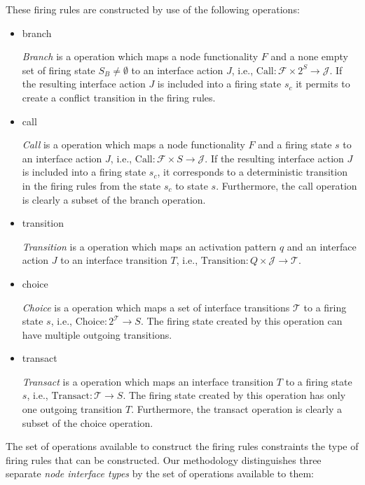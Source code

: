 These firing rules are constructed by use of the following operations:

\begin{itemize}
\item branch

\emph{Branch} is a operation which maps a node functionality $F$ and
a none empty set of firing state $S_{B} \ne \emptyset$ to an interface action $J$,
i.e., $\mathrm{Call}: \mathcal{F} \times 2^S \to \mathcal{J}$.
If the resulting interface action $J$ is included into a
firing state $s_{c}$ it permits to create a conflict transition
in the firing rules.
\item call

\emph{Call} is a operation which maps a node functionality $F$ and
a firing state $s$ to an interface action $J$,
i.e., $\mathrm{Call}: \mathcal{F} \times S \to \mathcal{J}$.
If the resulting interface action $J$ is included into a
firing state $s_{c}$, it corresponds to a deterministic transition
in the firing rules from the state $s_{c}$ to state $s$.
Furthermore, the call operation is clearly a subset of the
branch operation.

\item transition

\emph{Transition} is a operation which maps an activation pattern $q$ and
an interface action $J$ to an interface transition $T$,
i.e., $\mathrm{Transition}: Q \times \mathcal{J} \to \mathcal{T}$.

\item choice

\emph{Choice} is a operation which maps a set of interface transitions $\mathcal{T}$
to a firing state $s$,
i.e., $\mathrm{Choice}: 2^{\mathcal{T}} \to S$.
The firing state created by this operation can have multiple outgoing
transitions.

\item transact

\emph{Transact} is a operation which maps an interface transition $T$
to a firing state $s$,
i.e., $\mathrm{Transact}: \mathcal{T} \to S$.
The firing state created by this operation has only one outgoing
transition $T$. Furthermore, the transact operation is clearly a subset of the
choice operation.
\end{itemize}

The set of operations available to construct the firing rules constraints
the type of firing rules that can be constructed.
Our methodology distinguishes three separate \emph{node interface types}
by the set of operations available to them:

